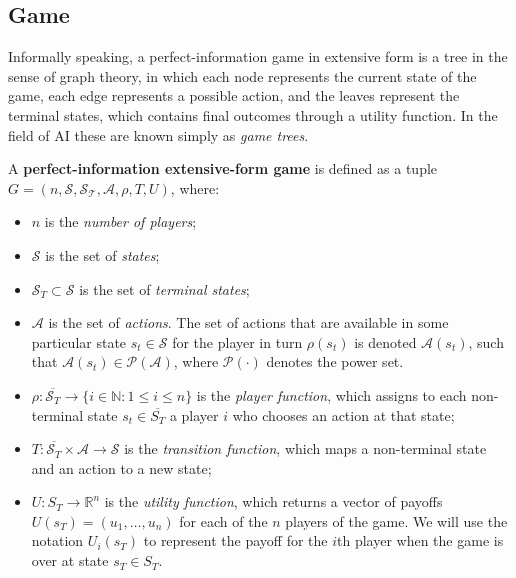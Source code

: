 \documentclass{article}
\begin{document}
\subsection{Game}

Informally speaking, a perfect-information game in extensive form is a tree in the sense of graph
theory, in which each node represents the current state of the game, each edge represents a
possible action, and the leaves represent the terminal states, which contains final outcomes
through a utility function. In the field of AI these are known simply as \emph{game trees}.

A \textbf{perfect-information extensive-form game} is defined as a tuple $G = (n, \mathcal{S},
\mathcal{S_T}, \mathcal{A}, \rho, T, U)$, where:


\begin{itemize}

    \item $n$ is the \emph{number of players};

    \item $\mathcal{S}$ is the set of \emph{states};

    \item $\mathcal{S}_T \subset \mathcal{S}$ is the set of \emph{terminal states};

    \item $\mathcal{A}$ is the set of \emph{actions}. The set of actions that are available in some
    particular state $s_t \in \mathcal{S}$ for the player in turn $\rho(s_t)$ is denoted
    $\mathcal{A}(s_t)$, such that $\mathcal{A}(s_t) \in \mathcal{P}(\mathcal{A})$, where
    $\mathcal{P}(\cdot)$ denotes the power set.

    \item $\rho : \overline{\mathcal{S}_T} \to \{i \in \mathbb{N} : 1 \leq i \leq n \} $ is the
    \emph{player function}, which assigns to each non-terminal state $s_t \in \overline{S_T}$ a
    player $i$ who chooses an action at that state;

    \item $T : \overline{\mathcal{S}_T} \times \mathcal{A} \to \mathcal{S}$ is the \emph{transition
    function}, which maps a non-terminal state and an action to a new state;

    \item $U : S_T \to \mathbb{R}^n $ is the \emph{utility function}, which returns a vector of
    payoffs $U(s_T) = (u_1, \dots, u_n)$ for each of the $n$ players of the game. We will use the
    notation $U_i(s_T)$ to represent the payoff for the $i$th player when the game is over at state
    $s_T \in S_T$.

\end{itemize}
\end{document}

